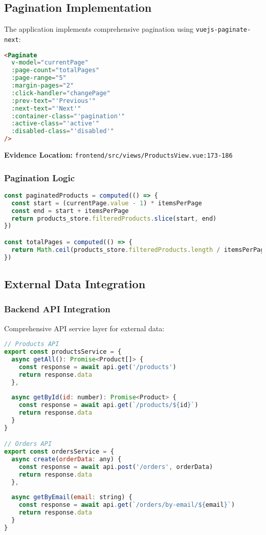 \documentclass[12pt,a4paper]{article}
\begin{document}
\subsection{Pagination Implementation}

The application implements comprehensive pagination using \texttt{vuejs-paginate-next}:

\begin{lstlisting}[language=html, caption=Pagination Component]
<Paginate
  v-model="currentPage"
  :page-count="totalPages"
  :page-range="5"
  :margin-pages="2"
  :click-handler="changePage"
  :prev-text="'Previous'"
  :next-text="'Next'"
  :container-class="'pagination'"
  :active-class="'active'"
  :disabled-class="'disabled'"
/>
\end{lstlisting}

\textbf{Evidence Location:} \texttt{frontend/src/views/ProductsView.vue:173-186}

\subsubsection{Pagination Logic}
\begin{lstlisting}[language=javascript, caption=Pagination Calculations]
const paginatedProducts = computed(() => {
  const start = (currentPage.value - 1) * itemsPerPage
  const end = start + itemsPerPage
  return products_store.filteredProducts.slice(start, end)
})

const totalPages = computed(() => {
  return Math.ceil(products_store.filteredProducts.length / itemsPerPage)
})
\end{lstlisting}

\subsection{External Data Integration}

\subsubsection{Backend API Integration}
Comprehensive API service layer for external data:

\begin{lstlisting}[language=javascript, caption=API Service Structure]
// Products API
export const productsService = {
  async getAll(): Promise<Product[]> {
    const response = await api.get('/products')
    return response.data
  },
  
  async getById(id: number): Promise<Product> {
    const response = await api.get(`/products/${id}`)
    return response.data
  }
}

// Orders API  
export const ordersService = {
  async create(orderData: any) {
    const response = await api.post('/orders', orderData)
    return response.data
  },
  
  async getByEmail(email: string) {
    const response = await api.get(`/orders/by-email/${email}`)
    return response.data
  }
}
\end{lstlisting}
\end{document}
